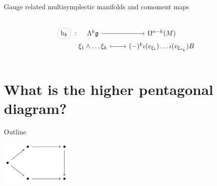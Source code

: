 \documentclass[10pt]{beamer}
\renewcommand{\checkpoint}[0]{
	\setcounter{tocdepth}{1}
	\addtocounter{framenumber}{-1}
 	\begin{frame}[t]{Outline}
  		\tableofcontents[currentsection]
		\begin{center}
			\includegraphics[width=3.5cm]{Pictures/Figure_pentagondiagm_page}
		\end{center}
	\end{frame}
}
\begin{document}
\begin{frame}{Gauge related multisymplectic manifolds and comoment maps}
\begin{lemblock}
\begin{columns}
\begin{column}{.625\linewidth}
{\begin{displaymath}
\begin{tikzcd}[baseline=(O.base),ampersand replacement=\&]
							|[alias=O]| 
							\tikz[baseline,remember picture]{\node[rounded corners,
	                        		fill=blue!2,draw=blue!30,align=center]            
	            					(base) {$\mathrm{b}_k$};}						
							~:\&[-3em] \Lambda^k\mathfrak{g} \ar[r]\& \Omega^{n-k}(M)
							\\[-2em]
							\& \xi_1\wedge\dots \xi_k \ar[r,mapsto] \&
							(-)^k \iota(v_{\xi_1})\dots \iota(v_{\xi_{x_k}}) B
						\end{tikzcd}		
						\end{displaymath}								
					}		
			\end{column}
		\end{columns}
		\bigskip
	\end{lemblock}
\end{frame}


\section{What is the \textbf{higher pentagonal diagram}?}
\checkpoint	
\end{document}
